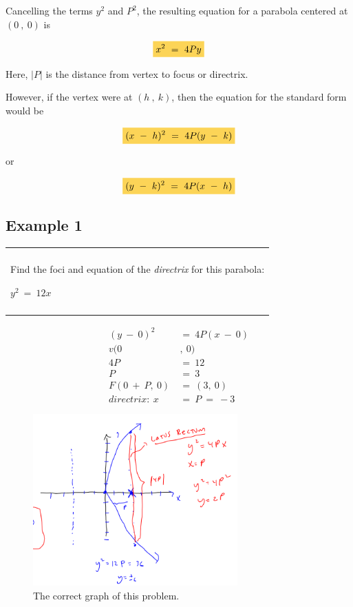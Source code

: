 \documentclass{article}
\newcommand{\highlight}[1]{%
  \colorbox{yellowOrange}{$\displaystyle#1$}}
\newenvironment{question}
  {\begin{center}
  \begin{tabular}{|p{0.9\textwidth}|}
  \hline\\
  }
  {
  \\\\\hline
  \end{tabular}
  \end{center}
  }
\begin{document}
Cancelling the terms $y^2$ and $P^2$, the resulting equation for a parabola centered at $(0\ ,\ 0)$ is

\begin{equation*}
  \highlight{x^2\ =\ 4Py}
\end{equation*}

Here, $|P|$ is the distance from vertex to focus or directrix.

However, if the vertex were at $(h\ ,\ k)$, then the equation for the standard form would be

\begin{equation*}
  \highlight{(x\ -\ h)^2\ =\ 4P(y\ -\ k)}
\end{equation*}
\begin{center}
  or
\end{center}
\begin{equation*}
  \highlight{(y\ -\ k)^2\ =\ 4P(x\ -\ h)}
\end{equation*}

\subsection{Example 1}

\begin{question}
  Find the foci and equation of the \emph{directrix} for this parabola:
  \begin{Center}
    $y^2\ =\ 12x$
  \end{Center}
\end{question}

\begin{align*}
  (y\ -\ 0)^2\ &=\ 4P(x\ -\ 0)\\
  v(0&,\ 0)\\
  4P\ &=\ 12\\
  P\ &=\ 3\\
  F(0\ +\ P,\ 0)\ &=\ (3,\ 0)\\
  directrix:\ x\ &=\ P\ =\ -3
\end{align*}
\begin{figure}[H]
  \includegraphics[width=0.7\textwidth,center]{parabola 1.png}
  \caption{The correct graph of this problem.}
  \label{fig:parabola2}
\end{figure}
\end{document}
